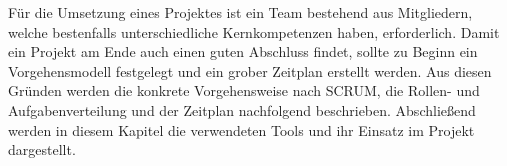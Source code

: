 Für die Umsetzung eines Projektes ist ein Team bestehend aus Mitgliedern, welche bestenfalls unterschiedliche Kernkompetenzen haben, erforderlich. Damit ein Projekt am Ende auch einen guten Abschluss findet, sollte zu Beginn ein Vorgehensmodell festgelegt und ein grober Zeitplan erstellt werden. Aus diesen Gründen werden die konkrete Vorgehensweise nach SCRUM, die Rollen- und Aufgabenverteilung und der Zeitplan nachfolgend beschrieben. Abschließend werden in diesem Kapitel die verwendeten Tools und ihr Einsatz im Projekt dargestellt.


